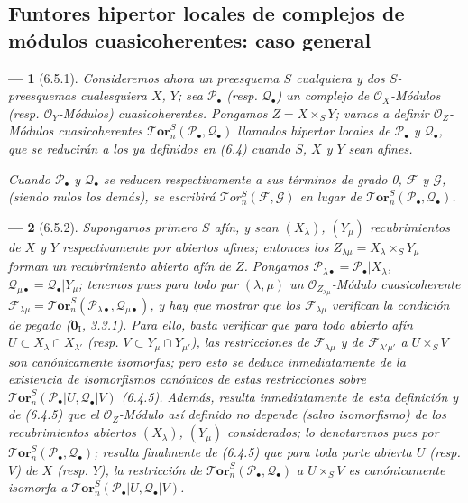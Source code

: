 \documentclass[10pt,oneside,openany]{book}
\theoremstyle{egaenv}\newtheorem*{env}{---}
\theoremstyle{egastatement}
\theoremstyle{egadescription}
\newcommand{\oldpage}[2][]{\marginnote{\normalfont\scriptsize\textbf{#1}\,|\,#2}\ignorespaces}
\begin{document}
\subsection{Funtores hipertor locales de complejos de módulos cuasicoherentes: caso general}
\label{subsection:III.6.5}

\begin{env}[6.5.1]
Consideremos ahora un preesquema $S$ cualquiera y dos $S$-preesquemas
cualesquiera $X$, $Y$; sea $\mathscr P_\bullet$ (resp. $\mathscr Q_\bullet$)
un complejo de $\mathscr O_X$-Módulos (resp. $\mathscr O_Y$-Módulos)
cuasicoherentes. Pongamos $Z=X\times_S Y$; vamos a definir
$\mathscr O_Z$-Módulos cuasicoherentes
$\boldsymbol{\mathscr{T}\!or}_n^S(\mathscr P_\bullet,\mathscr Q_\bullet)$ llamados
\emph{hipertor locales} de $\mathscr P_\bullet$ y $\mathscr Q_\bullet$, que se
reducirán a los ya definidos en (6.4) cuando $S$, $X$ y $Y$ sean afines.

Cuando $\mathscr P_\bullet$ y $\mathscr Q_\bullet$ se reducen
respectivamente a sus términos de grado 0, $\mathscr F$ y $\mathscr G$, (siendo
nulos los demás), se escribirá
$\mathscr{T}\!or_n^S(\mathscr F,\mathscr G)$ en lugar de
$\boldsymbol{\mathscr{T}\!or}_n^S(\mathscr P_\bullet,\mathscr Q_\bullet)$.
\end{env}

\begin{env}[6.5.2]
Supongamos primero $S$ \emph{afín}, y sean $(X_\lambda)$, $(Y_\mu)$
recubrimientos de $X$ y $Y$ respectivamente por abiertos afines; entonces los
$Z_{\lambda\mu}=X_\lambda\times_S Y_\mu$ forman un recubrimiento abierto afín
de $Z$. Pongamos
$\mathscr P_{\lambda\bullet}=\mathscr P_\bullet|X_\lambda$,
$\mathscr Q_{\mu\bullet}=\mathscr Q_\bullet|Y_\mu$; tenemos pues para todo
par $(\lambda,\mu)$ un $\mathscr O_{Z_{\lambda\mu}}$-Módulo cuasicoherente
$\mathscr F_{\lambda\mu}
  =\boldsymbol{\mathscr{T}\!or}_n^S
   (\mathscr P_{\lambda\bullet},\mathscr Q_{\mu\bullet})$,
y hay que mostrar que los $\mathscr F_{\lambda\mu}$ verifican la condición de
pegado ($\mathbf{0}_{\mathrm I}$, 3.3.1). Para ello, basta verificar que para
todo abierto afín $U\subset X_\lambda\cap X_{\lambda'}$ (resp.
$V\subset Y_\mu\cap Y_{\mu'}$), las restricciones de
$\mathscr F_{\lambda\mu}$ y de $\mathscr F_{\lambda'\mu'}$ a $U\times_S V$
son canónicamente isomorfas; pero esto se deduce inmediatamente de la existencia
de isomorfismos canónicos de estas restricciones sobre
$\boldsymbol{\mathscr{T}\!or}_n^S(\mathscr P_\bullet|U,\mathscr Q_\bullet|V)$ (6.4.5).
Además, resulta inmediatamente de esta definición y de (6.4.5) que el
$\mathscr O_Z$-Módulo así definido no depende (salvo isomorfismo) de los
recubrimientos abiertos $(X_\lambda)$, $(Y_\mu)$ consi\oldpage[III]{149}derados;
lo denotaremos pues por
$\boldsymbol{\mathscr{T}\!or}_n^S(\mathscr P_\bullet,\mathscr Q_\bullet)$; resulta finalmente
de (6.4.5) que para \emph{toda} parte abierta $U$ (resp. $V$) de $X$ (resp. $Y$), la
restricción de $\boldsymbol{\mathscr{T}\!or}_n^S(\mathscr P_\bullet,\mathscr Q_\bullet)$ a
$U\times_S V$ es canónicamente isomorfa a
$\boldsymbol{\mathscr{T}\!or}_n^S(\mathscr P_\bullet|U,\mathscr Q_\bullet|V)$.
\end{env}
\end{document}
